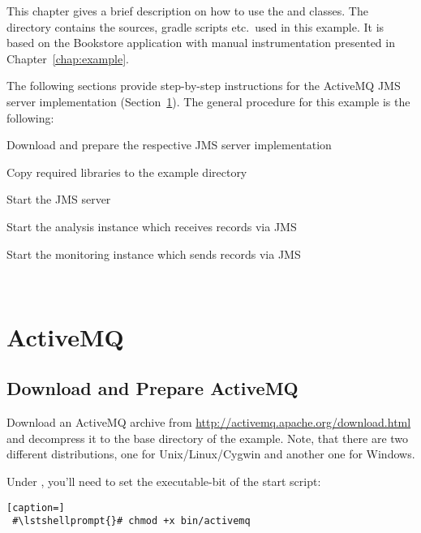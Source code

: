 This chapter gives a brief description on how to use the  and  %
classes. The directory \dir{\JMSBookstoreApplicationReleaseDirDistro/} contains the %
sources, gradle scripts etc.\ used in this example. It is based on the Bookstore %
application with manual instrumentation presented in Chapter~\ref{chap:example}. %

The following sections provide step-by-step instructions for the %
ActiveMQ JMS server implementation (Section~\ref{example:jms:activemq}).
The general procedure for this example is the following:

\medskip

\begin{compactenum}
 \item Download and prepare the respective JMS server implementation
 \item Copy required libraries to the example directory
 \item Start the JMS server
 \item Start the analysis instance which receives records via JMS
 \item Start the monitoring instance which sends records via JMS
\end{compactenum}

\


\section{ActiveMQ}\label{example:jms:activemq}

\subsection{Download and Prepare ActiveMQ}

Download an ActiveMQ archive from \url{http://activemq.apache.org/download.html}
and decompress it to the base directory of the example. Note, that there are two different %
distributions, one for Unix/Linux/Cygwin and another one for Windows. 

Under \UnixLikeSystems{}, you'll need to set the executable-bit of the start script:

\setBashListing
\begin{lstlisting}[caption=]
 #\lstshellprompt{}# chmod +x bin/activemq
\end{lstlisting}


